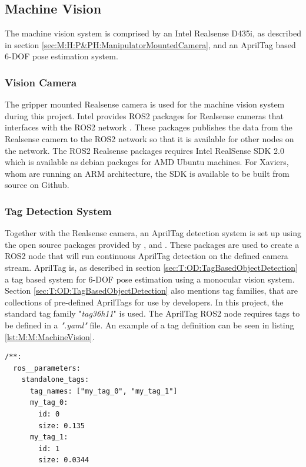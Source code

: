 \subsection{Machine Vision} \label{sec:M:MRC:MachineVision}
The machine vision system is comprised by an Intel Realsense D435i, as described in section \ref{sec:M:H:P&PH:ManipulatorMountedCamera}, and an AprilTag based 6-DOF pose estimation system.

\subsubsection{Vision Camera} 
The gripper mounted Realsense camera is used for the machine vision system during this project. Intel provides ROS2 packages for Realsense cameras that interfaces with the ROS2 network \cite{realsense_ros_repo}. These packages publishes the data from the Realsense camera to the ROS2 network so that it is available for other nodes on the network. The ROS2 Realsense packages requires Intel RealSense SDK 2.0 which is available as debian packages for AMD Ubuntu machines. For Xaviers, whom are running an ARM architecture, the SDK is available to be built from source on Github\cite{realsense_jetson_guide}.

\subsubsection{Tag Detection System} \label{sec:M:MRC:MV:TagDetectionSystem}
Together with the Realsense camera, an AprilTag detection system is set up using the open source packages provided by \cite{apriltag_repo}, \cite{apriltag_ros_repo} and \cite{apriltag_msgs_repo}. These packages are used to create a ROS2 node that will run continuous AprilTag detection on the defined camera stream. AprilTag is, as described in section \ref{sec:T:OD:TagBasedObjectDetection} a tag based system for 6-DOF pose estimation using a monocular vision system. Section \ref{sec:T:OD:TagBasedObjectDetection} also mentions tag families, that are collections of pre-defined AprilTags for use by developers. In this project, the standard tag family "\textit{tag36h11}" is used. The AprilTag ROS2 node requires tags to be defined in a \textit{".yaml"} file. An example of a tag definition can be seen in listing \ref{lst:M:M:MachineVision}.

\begin{lstlisting}[language=XML, label=lst:M:M:MachineVision, caption={Example of AprilTag tag definitions in a ".yaml" file. This example defines two tags of different names, using the tag id 0 and 1 in the defined tag family The size is alse defined for each tag. The tag family (tag36h11) is set in another parameter file.}]
/**:
  ros__parameters:
    standalone_tags:
      tag_names: ["my_tag_0", "my_tag_1"]
      my_tag_0:
        id: 0
        size: 0.135
      my_tag_1:
        id: 1
        size: 0.0344
\end{lstlisting}

